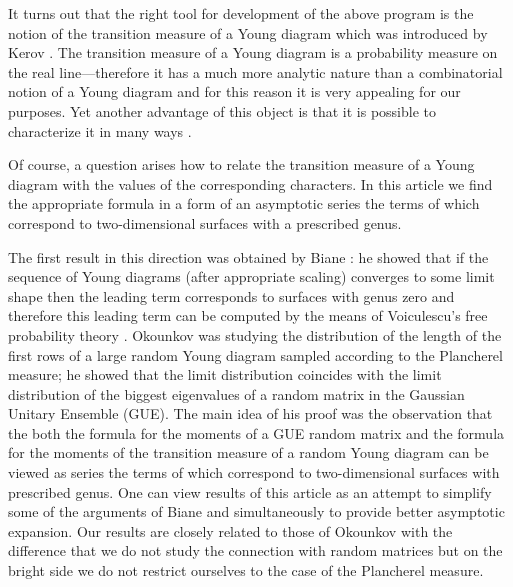 \documentclass[12pt,dvips]{amsart}
\numberwithin{equation}{section} \numberwithin{figure}{section}
\theoremstyle{plain}
\theoremstyle{definition}
\theoremstyle{remark}
\begin{document}
It turns out that the right tool for development of the above
program is the notion of the transition measure of a Young diagram
which was introduced by Kerov
\cite{Kerov1993transition,Kerov1999differential}.
The transition measure of a Young diagram is a probability measure
on the real line---therefore it has a much more analytic nature than
a combinatorial notion of a Young diagram and for this reason it is
very appealing for our purposes. Yet another advantage of this
object is that it is possible to characterize it in many ways
\cite{Biane1998,Okounkov2000randompermutations}.

Of course, a question arises how to relate the transition measure of
a Young diagram with the values of the corresponding characters.
In this article we find the appropriate formula in a form of an
asymptotic series the terms of which correspond to two-dimensional
surfaces with a prescribed genus.

The first result in this direction was obtained by Biane
\cite{Biane1998}: he showed that if the sequence of Young diagrams
(after appropriate scaling) converges to some limit shape then the
leading term corresponds to surfaces with genus zero and therefore
this leading term can be computed by the means of Voiculescu's free
probability theory \cite{VoiculescuDykemaNica,HiaiPetz2000}.
Okounkov \cite{Okounkov2000randompermutations} was studying the
distribution of the length of the first rows of a large random Young
diagram sampled according to the Plancherel measure; he showed that
the limit distribution coincides with the limit distribution of the
biggest eigenvalues of a random matrix in the Gaussian Unitary
Ensemble (GUE). The main idea of his proof was the observation that
the both the formula for the moments of a GUE random matrix and the
formula for the moments of the transition measure of a random Young
diagram can be viewed as series the terms of which correspond to
two-dimensional surfaces with prescribed genus. One can view results
of this article as an attempt to simplify some of the arguments of
Biane \cite{Biane1998} and simultaneously to provide better
asymptotic expansion. Our results are closely related to those of
Okounkov \cite{Okounkov2000randompermutations} with the difference
that we do not study the connection with random matrices but on the
bright side we do not restrict ourselves to the case of the
Plancherel measure.
\end{document}
